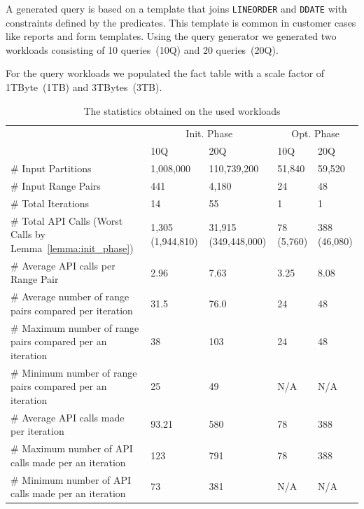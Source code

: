 \documentclass[runningheads]{comsis2}
\begin{document}
A generated query is based on a template that joins {\tt LINEORDER} and 
{\tt DDATE} with constraints defined by the predicates. 
This template is common in customer cases like reports and form 
templates. 
Using the query generator we generated two workloads consisting of 10 queries~(10Q) and 20 queries~(20Q). 

For the query workloads we populated the fact table with a scale factor of 1TByte~(1TB) and 3TBytes~(3TB).

\begin{table}[t]
\caption{The statistics obtained on the used workloads\label{tab:workload_stat}}
\begin{center}
{\scriptsize
\begin{tabular}{|l|l|l|l|l|} \hline
		   			   							   & \multicolumn{2}{|c|}{Init. Phase} & \multicolumn{2}{|c|}{Opt. Phase} \\ \cline{2-5}
		   			   							   & 10Q & 20Q & 10Q & 20Q \\ \hline
{\# Input Partitions}  							   & 1,008,000 & 110,739,200 & 51,840 & 59,520 \\ \hline
{\# Input Range Pairs} 							   & 441 & 4,180 & 24 & 48\\ \hline
{\# Total Iterations}  							   & 14 & 55 & 1 & 1 \\ \hline
{\# Total API Calls (Worst Calls by Lemma~\ref{lemma:init_phase}})   & 1,305 (1,944,810) & 31,915 (349,448,000) & 78 (5,760) & 388 (46,080) \\ \hline
{\# Average API calls per Range Pair} 		  	   & 2.96 & 7.63 & 3.25 & 8.08 \\ \hline
{\# Average number of range pairs compared per iteration} 	   & 31.5 & 76.0 & 24 & 48 \\ \hline
{\# Maximum number of range pairs compared per an iteration} & 38 & 103 & 24 & 48 \\ \hline
{\# Minimum number of range pairs compared per an iteration} & 25 & 49 & N/A & N/A\\ \hline
{\# Average API calls made per iteration}		   & 93.21 & 580 & 78 & 388 \\ \hline
{\# Maximum number of API calls made per an iteration} 	   & 123 & 791 & 78 & 388 \\ \hline
{\# Minimum number of API calls made per an iteration} 	   & 73 & 381 & N/A & N/A \\ \hline
\end{tabular}
}
\end{center}
\vspace{-0.3in}
\end{table}
\end{document}
